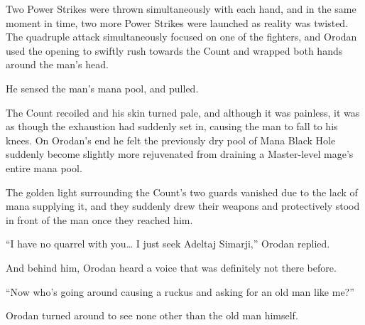 \documentclass[a4paper,10pt]{book}
\begin{document}
Two Power Strikes were thrown simultaneously with each hand, and in the same moment in time, two more Power Strikes were launched as reality was twisted. The quadruple attack simultaneously focused on one of the fighters, and Orodan used the opening to swiftly rush towards the Count and wrapped both hands around the man’s head.\par
He sensed the man’s mana pool, and pulled.\par
The Count recoiled and his skin turned pale, and although it was painless, it was as though the exhaustion had suddenly set in, causing the man to fall to his knees. On Orodan’s end he felt the previously dry pool of Mana Black Hole suddenly become slightly more rejuvenated from draining a Master-level mage's entire mana pool.\par
The golden light surrounding the Count’s two guards vanished due to the lack of mana supplying it, and they suddenly drew their weapons and protectively stood in front of the man once they reached him.\par
“I have no quarrel with you… I just seek Adeltaj Simarji,” Orodan replied.\par
And behind him, Orodan heard a voice that was definitely not there before.\par
“Now who’s going around causing a ruckus and asking for an old man like me?”\par
Orodan turned around to see none other than the old man himself.\par
\end{document}
